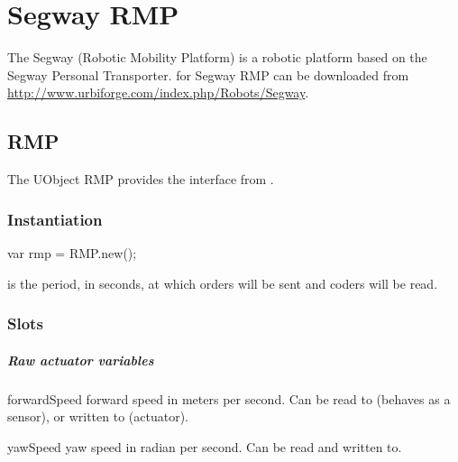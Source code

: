 
\chapter{Segway RMP}
\label{sec:segway-rmp}

The Segway  (Robotic Mobility Platform) is a robotic platform based
on the Segway Personal Transporter.  \urbi for Segway RMP can be downloaded
from \url{http://www.urbiforge.com/index.php/Robots/Segway}.

\section{RMP}

The UObject RMP provides the interface from \urbi.

\subsection{Instantiation}

\begin{urbiunchecked}
var rmp = RMP.new();
\end{urbiunchecked}

 is the period, in seconds, at which orders will be sent and
coders will be read.

\subsection{Slots}

\paragraph{Raw actuator variables}

\begin{urbiscriptapi}
\item[forwardSpeed] forward speed in meters per second.  Can be read to
  (behaves as a sensor), or written to (actuator).
\item[yawSpeed] yaw speed in radian per second.  Can be read and written
  to.
\end{urbiscriptapi}

